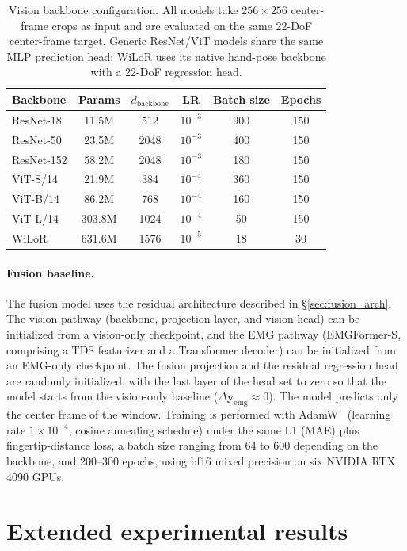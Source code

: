 \documentclass{article}
\newcommand{\model}{EMGFormer}
\begin{document}
\begin{table}[h]
\centering
\caption{Vision backbone configuration. All models take $256\times256$ center-frame crops as input and are evaluated on the same 22-DoF center-frame target. Generic ResNet/ViT models share the same MLP prediction head; WiLoR uses its native hand-pose backbone with a 22-DoF regression head.}
\label{tab:vision_config}
\begin{tabular}{lccccc}
\toprule
Backbone & Params & $d_{\text{backbone}}$ & LR & Batch size & Epochs \\
\midrule
ResNet-18  & 11.5M  & 512  & $10^{-3}$ & 900 & 150 \\
ResNet-50  & 23.5M  & 2048 & $10^{-3}$ & 400 & 150 \\
ResNet-152 & 58.2M  & 2048 & $10^{-3}$ & 180 & 150 \\
ViT-S/14   & 21.9M  & 384  & $10^{-4}$ & 360 & 150 \\
ViT-B/14   & 86.2M  & 768  & $10^{-4}$ & 160 & 150 \\
ViT-L/14   & 303.8M & 1024 & $10^{-4}$ & 50  & 150 \\
WiLoR      & 631.6M & 1576   & $10^{-5}$ & 18  & 30 \\
\bottomrule
\end{tabular}
\end{table}

\paragraph{Fusion baseline.}
The fusion model uses the residual architecture described in \S\ref{sec:fusion_arch}. The vision pathway (backbone, projection layer, and vision head) can be initialized from a vision-only checkpoint, and the EMG pathway (\model{}-S, comprising a TDS featurizer and a Transformer decoder) can be initialized from an EMG-only checkpoint. The fusion projection and the residual regression head are randomly initialized, with the last layer of the head set to zero so that the model starts from the vision-only baseline ($\Delta\mathbf{y}_{\text{emg}} \approx 0$). The model predicts only the center frame of the window. Training is performed with AdamW~\citep{adamw} (learning rate $1 \times 10^{-4}$, cosine annealing schedule) under the same L1 (MAE) plus fingertip-distance loss, a batch size ranging from 64 to 600 depending on the backbone, and 200--300 epochs, using bf16 mixed precision on six NVIDIA RTX 4090 GPUs.

\FloatBarrier
\section{Extended experimental results}
\end{document}
